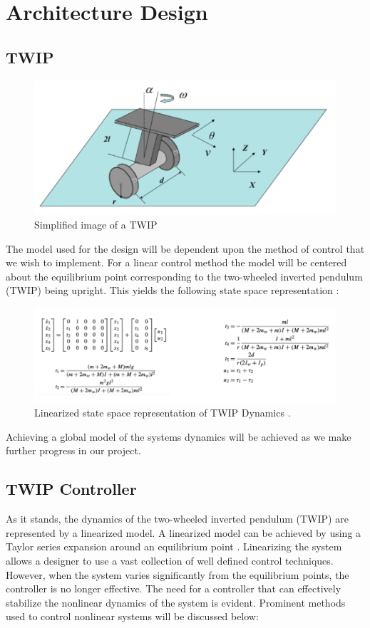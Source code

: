 \documentclass[a4paper,12pt]{article}
\begin{document}
\section{Architecture Design}
\subsection{TWIP}
	\begin{figure}[H]
\includegraphics[width = \textwidth]{images/PDS_TWIP.png}
\caption{Simplified image of a TWIP}
	\end{figure}
The model used for the design will be dependent upon the method of control that we wish to implement. For a linear control method the model will be centered about the equilibrium point corresponding to the two-wheeled inverted pendulum (TWIP) being upright. This yields the following state space representation \cite{yang} :
	\begin{figure}[H]
\includegraphics[width = \textwidth]{images/PDS_StateSpace.png}
\caption{Linearized state space representation of TWIP Dynamics \cite{yang}.}
	\end{figure}
Achieving a global model of the systems dynamics will be achieved as we make further progress in our project. 
\subsection{TWIP Controller}
As it stands, the dynamics of the two-wheeled inverted pendulum (TWIP) are represented by a linearized model. A linearized model can be achieved by using a Taylor series expansion around an equilibrium point \cite{yang}. Linearizing the system allows a designer to use a vast collection of well defined control techniques. However, when the system varies significantly from the equilibrium points, the controller is no longer effective. The need for a controller that can effectively stabilize the nonlinear dynamics of the system is evident. Prominent methods used to control nonlinear systems will be discussed below:
\end{document}

